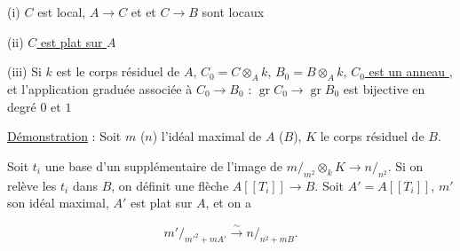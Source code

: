 (i) $C$ est local, $A\longrightarrow C$ et et $C\longrightarrow B$ sont locaux

(ii) \uline{$C$ est plat sur $A$}

(iii) Si $k$ est le corps résiduel de $A$, $C_0=C\otimes_A k$, $B_0=B\otimes_A k$, \uline{$C_0$ est un anneau }, et l'application graduée associée à $C_0\longrightarrow B_0$ : $\operatorname{gr}C_0\longrightarrow\operatorname{gr}B_0$ est bijective en degré $0$ et $1$

\uline{Démonstration} : Soit $m$ ($n$) l'idéal maximal de $A$ ($B$), $K$ le corps résiduel de $B$.

Soit $t_i$ une base d'un supplémentaire de l'image de $m/_{m^2}\otimes_k K\longrightarrow n/_{n^2}$. Si on relève les $t_i$ dans $B$, on définit une flèche $A[[T_i]]\longrightarrow B$. Soit $A'=A[[T_i]]$, $m'$ son idéal maximal, $A'$ est plat sur $A$, et on a 

\[
m'/_{m'^2+mA'}\xrightarrow{\sim} n/_{n^2+mB}.
\]
